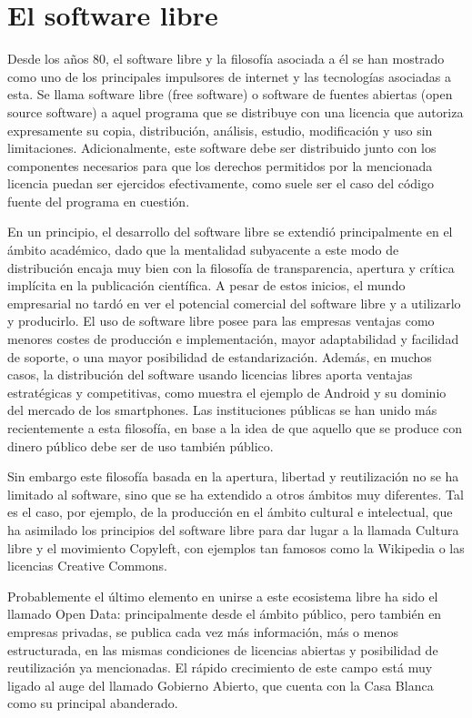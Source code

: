 \documentclass[10pt,twoside,spanish]{article}
\numberwithin{equation}{section}
\begin{document}
\section{El software libre}

Desde los años 80, el software libre y la filosofía asociada a él se han mostrado como uno de los principales impulsores de internet y las tecnologías asociadas a esta. Se llama software libre (free software) o software de fuentes abiertas (open source software) a aquel programa que se distribuye con una licencia que autoriza expresamente su copia, distribución, análisis, estudio, modificación y uso sin limitaciones. Adicionalmente, este software debe ser distribuido junto con los componentes necesarios para que los derechos permitidos por la mencionada licencia puedan ser ejercidos efectivamente, como suele ser el caso del código fuente del programa en cuestión. 

En un principio, el desarrollo del software libre se extendió principalmente en el ámbito académico, dado que la mentalidad subyacente a este modo de distribución encaja muy bien con la filosofía de transparencia, apertura y crítica implícita en la publicación científica. A pesar de estos inicios, el mundo empresarial no tardó en ver el potencial comercial del software libre y a utilizarlo y producirlo. El uso de software libre posee para las empresas ventajas como menores costes de producción e implementación, mayor adaptabilidad y facilidad de soporte, o una mayor posibilidad de estandarización. Además, en muchos casos, la distribución del software usando licencias libres aporta ventajas estratégicas y competitivas, como muestra el ejemplo de Android y su dominio del mercado de los smartphones. Las instituciones públicas se han unido más recientemente a esta filosofía, en base a la idea de que aquello que se produce con dinero público debe ser de uso también público.

Sin embargo este filosofía basada en la apertura, libertad y reutilización no se ha limitado al software, sino que se ha extendido a otros ámbitos muy diferentes. Tal es el caso, por ejemplo, de la producción en el ámbito cultural e intelectual, que ha asimilado los principios del software libre para dar lugar a la llamada Cultura libre y el movimiento Copyleft, con ejemplos tan famosos como la Wikipedia o las licencias Creative Commons.

Probablemente el último elemento en unirse a este ecosistema libre ha sido el llamado Open Data: principalmente desde el ámbito público, pero también en empresas privadas, se publica cada vez más información, más o menos estructurada, en las mismas condiciones de licencias abiertas y posibilidad de reutilización ya mencionadas. El rápido crecimiento de este campo está muy ligado al auge del llamado Gobierno Abierto, que cuenta con la Casa Blanca como su principal abanderado.
\end{document}
